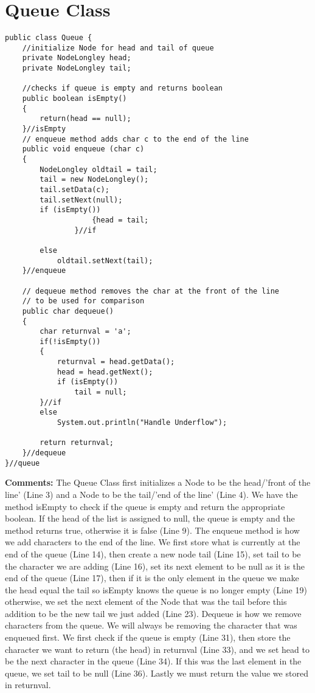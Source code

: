 \documentclass{article}
\begin{document}
\section{Queue Class}
\begin{lstlisting}[frame =single,
backgroundcolor = \color{grey!12}]
public class Queue {
	//initialize Node for head and tail of queue
	private NodeLongley head;
	private NodeLongley tail;
	
	//checks if queue is empty and returns boolean
	public boolean isEmpty()
	{
		return(head == null);
	}//isEmpty
	// enqueue method adds char c to the end of the line 
	public void enqueue (char c) 
	{
		NodeLongley oldtail = tail;
		tail = new NodeLongley();
		tail.setData(c);
		tail.setNext(null);
		if (isEmpty())
    	        	{head = tail;
	        	}//if	
	       
		else
			oldtail.setNext(tail);
	}//enqueue
	
	// dequeue method removes the char at the front of the line 
	// to be used for comparison 
	public char dequeue()
	{
		char returnval = 'a';
		if(!isEmpty()) 
		{
			returnval = head.getData();
			head = head.getNext();
			if (isEmpty())
				tail = null;
		}//if
		else 
			System.out.println("Handle Underflow");
		
		return returnval;
	}//dequeue
}//queue
\end{lstlisting}
\textbf{Comments:}
The Queue Class first initializes a Node to be the head/'front of the line' (Line 3) and a Node to be the tail/'end of the line' (Line 4). We have the method isEmpty to check if the queue is empty and return the appropriate boolean. If the head of the list is assigned to null, the queue is empty and the method returns true, otherwise it is false (Line 9). The enqueue method is how we add characters to the end of the line. We first store what is currently at the end of the queue (Line 14), then create a new node tail (Line 15), set tail to be the character we are adding (Line 16), set its next element to be null as it is the end of the queue (Line 17), then if it is the only element in the queue we make the head equal the tail so isEmpty knows the queue is no longer empty (Line 19) otherwise, we set the next element of the Node that was the tail before this addition to be the new tail we just added (Line 23). Dequeue is how we remove characters from the queue. We will always be removing the character that was enqueued first. We first check if the queue is empty (Line 31), then store the character we want to return (the head) in returnval (Line 33), and we set head to be the next character in the queue (Line 34). If this was the last element in the queue, we set tail to be null (Line 36). Lastly we must return the value we stored in returnval. 
\end{document}
